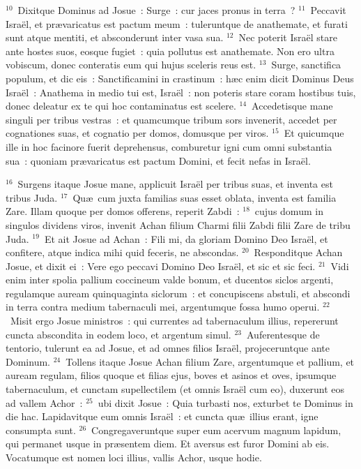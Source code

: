 ${}^{10}$~Dixitque Dominus ad Josue~: Surge~: cur jaces pronus in terra~?
${}^{11}$~Peccavit Isra\"el, et pr\ae varicatus est pactum meum~: tuleruntque de anathemate, et furati sunt atque mentiti, et absconderunt inter vasa sua.
${}^{12}$~Nec poterit Isra\"el stare ante hostes suos, eosque fugiet~: quia pollutus est anathemate. Non ero ultra vobiscum, donec conteratis eum qui hujus sceleris reus est.
${}^{13}$~Surge, sanctifica populum, et dic eis~: Sanctificamini in crastinum~: h\ae c enim dicit Dominus Deus Isra\"el~: Anathema in medio tui est, Isra\"el~: non poteris stare coram hostibus tuis, donec deleatur ex te qui hoc contaminatus est scelere.
${}^{14}$~Accedetisque mane singuli per tribus vestras~: et quamcumque tribum sors invenerit, accedet per cognationes suas, et cognatio per domos, domusque per viros.
${}^{15}$~Et quicumque ille in hoc facinore fuerit deprehensus, comburetur igni cum omni substantia sua~: quoniam pr\ae varicatus est pactum Domini, et fecit nefas in Isra\"el.


${}^{16}$~Surgens itaque Josue mane, applicuit Isra\"el per tribus suas, et inventa est tribus Juda.
${}^{17}$~Qu\ae\ cum juxta familias suas esset oblata, inventa est familia Zare. Illam quoque per domos offerens, reperit Zabdi~:
${}^{18}$~cujus domum in singulos dividens viros, invenit Achan filium Charmi filii Zabdi filii Zare de tribu Juda.
${}^{19}$~Et ait Josue ad Achan~: Fili mi, da gloriam Domino Deo Isra\"el, et confitere, atque indica mihi quid feceris, ne abscondas.
${}^{20}$~Responditque Achan Josue, et dixit ei~: Vere ego peccavi Domino Deo Isra\"el, et sic et sic feci.
${}^{21}$~Vidi enim inter spolia pallium coccineum valde bonum, et ducentos siclos argenti, regulamque auream quinquaginta siclorum~: et concupiscens abstuli, et abscondi in terra contra medium tabernaculi mei, argentumque fossa humo operui.
${}^{22}$~Misit ergo Josue ministros~: qui currentes ad tabernaculum illius, repererunt cuncta abscondita in eodem loco, et argentum simul.
${}^{23}$~Auferentesque de tentorio, tulerunt ea ad Josue, et ad omnes filios Isra\"el, projeceruntque ante Dominum.
${}^{24}$~Tollens itaque Josue Achan filium Zare, argentumque et pallium, et auream regulam, filios quoque et filias ejus, boves et asinos et oves, ipsumque tabernaculum, et cunctam supellectilem (et omnis Isra\"el cum eo), duxerunt eos ad vallem Achor~:
${}^{25}$~ubi dixit Josue~: Quia turbasti nos, exturbet te Dominus in die hac. Lapidavitque eum omnis Isra\"el~: et cuncta qu\ae\ illius erant, igne consumpta sunt.
${}^{26}$~Congregaveruntque super eum acervum magnum lapidum, qui permanet usque in pr\ae sentem diem. Et aversus est furor Domini ab eis. Vocatumque est nomen loci illius, vallis Achor, usque hodie.


